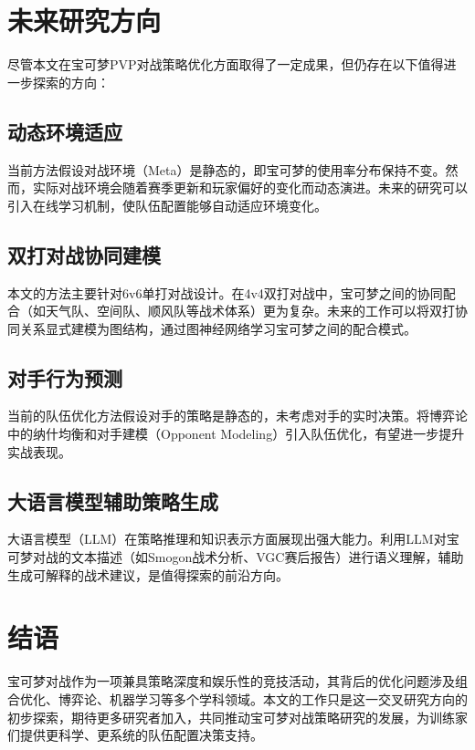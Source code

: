 \section{未来研究方向}

尽管本文在宝可梦PVP对战策略优化方面取得了一定成果，但仍存在以下值得进一步探索的方向：

\subsection{动态环境适应}

当前方法假设对战环境（Meta）是静态的，即宝可梦的使用率分布保持不变。然而，实际对战环境会随着赛季更新和玩家偏好的变化而动态演进。未来的研究可以引入在线学习机制，使队伍配置能够自动适应环境变化。

\subsection{双打对战协同建模}

本文的方法主要针对6v6单打对战设计。在4v4双打对战中，宝可梦之间的协同配合（如天气队、空间队、顺风队等战术体系）更为复杂。未来的工作可以将双打协同关系显式建模为图结构，通过图神经网络学习宝可梦之间的配合模式。

\subsection{对手行为预测}

当前的队伍优化方法假设对手的策略是静态的，未考虑对手的实时决策。将博弈论中的纳什均衡和对手建模（Opponent Modeling）引入队伍优化，有望进一步提升实战表现。

\subsection{大语言模型辅助策略生成}

大语言模型（LLM）在策略推理和知识表示方面展现出强大能力。利用LLM对宝可梦对战的文本描述（如Smogon战术分析、VGC赛后报告）进行语义理解，辅助生成可解释的战术建议，是值得探索的前沿方向。

\section{结语}

宝可梦对战作为一项兼具策略深度和娱乐性的竞技活动，其背后的优化问题涉及组合优化、博弈论、机器学习等多个学科领域。本文的工作只是这一交叉研究方向的初步探索，期待更多研究者加入，共同推动宝可梦对战策略研究的发展，为训练家们提供更科学、更系统的队伍配置决策支持。

